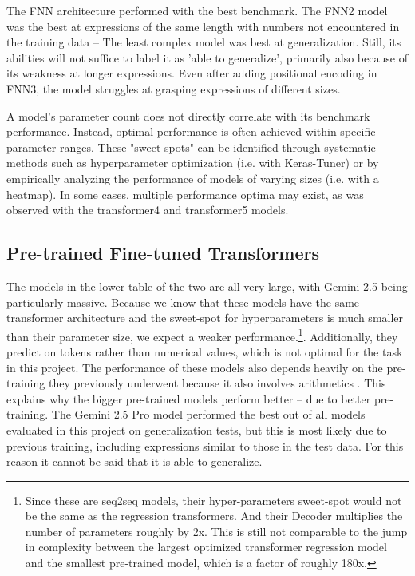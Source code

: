 \documentclass{article}
\begin{document}
The FNN architecture performed with the best benchmark. The FNN2 model was the best at expressions of the same length with numbers not encountered in the training data -- The least complex model was best at generalization. Still, its abilities will not suffice to label it as 'able to generalize', primarily also because of its weakness at longer expressions. Even after adding positional encoding in FNN3, the model struggles at grasping expressions of different sizes.

A model's parameter count does not directly correlate with its benchmark performance. Instead, optimal performance is often achieved within specific parameter ranges. These "sweet-spots" can be identified through systematic methods such as hyperparameter optimization (i.e. with Keras-Tuner) or by empirically analyzing the performance of models of varying sizes (i.e. with a heatmap). In some cases, multiple performance optima may exist, as was observed with the transformer4 and transformer5 models.

\subsection{Pre-trained Fine-tuned Transformers}
The models in the lower table of the two are all very large, with Gemini 2.5 being particularly massive. Because we know that these models have the same transformer architecture and the sweet-spot for hyperparameters is much smaller than their parameter size, we expect a weaker performance.\footnote{Since these are seq2seq models, their hyper-parameters sweet-spot would not be the same as the regression transformers. And their Decoder multiplies the number of parameters roughly by 2x. This is still not comparable to the jump in complexity between the largest optimized transformer regression model and the smallest pre-trained model, which is a factor of roughly 180x.}. Additionally, they predict on tokens rather than numerical values, which is not optimal for the task in this project. The performance of these models also depends heavily on the pre-training they previously underwent because it also involves arithmetics \cite{wei2022emergentabilitieslargelanguage}. This explains why the bigger pre-trained models perform better -- due to better pre-training. The Gemini 2.5 Pro model performed the best out of all models evaluated in this project on generalization tests, but this is most likely due to previous training, including expressions similar to those in the test data. For this reason it cannot be said that it is able to generalize.
\end{document}

